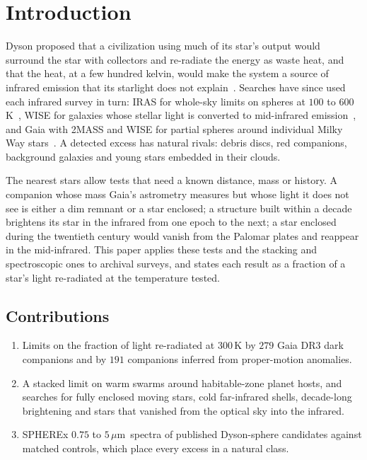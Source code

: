 \documentclass[3p,11pt]{elsarticle}
\newcommand{\um}{\,$\mu$m}
\begin{document}
\section{Introduction}\label{sec:intro}

Dyson proposed that a civilization using much of its star's output would surround the
star with collectors and re-radiate the energy as waste heat, and that the heat, at a
few hundred kelvin, would make the system a source of infrared emission that its
starlight does not explain~\cite{Dyson1960}. Searches have since used each infrared
survey in turn: IRAS for whole-sky limits on spheres at $100$ to $600$\,K~\cite{Carrigan2009},
WISE for galaxies whose stellar light is converted to mid-infrared
emission~\cite{Wright2014,Griffith2015}, and Gaia with 2MASS and WISE for partial spheres
around individual Milky Way stars~\cite{Suazo2022,Suazo2024,Contardo2024}. A detected
excess has natural rivals: debris discs, red companions, background galaxies and
young stars embedded in their clouds.

The nearest stars allow tests that need a known distance, mass or history. A companion
whose mass Gaia's astrometry measures but whose light it does not see is either a dim
remnant or a star enclosed; a structure built within a decade brightens its star in the
infrared from one epoch to the next; a star enclosed during the twentieth century would
vanish from the Palomar plates and reappear in the mid-infrared. This paper applies
these tests and the stacking and spectroscopic ones to archival surveys, and states each
result as a fraction of a star's light re-radiated at the temperature tested.

\subsection{Contributions}
\begin{enumerate}[leftmargin=*,itemsep=1pt]
\item Limits on the fraction of light re-radiated at $300$\,K by $279$ Gaia DR3 dark
companions and by $191$ companions inferred from proper-motion anomalies.
\item A stacked limit on warm swarms around habitable-zone planet hosts, and searches
for fully enclosed moving stars, cold far-infrared shells, decade-long brightening and
stars that vanished from the optical sky into the infrared.
\item SPHEREx $0.75$ to $5$\um\ spectra of published Dyson-sphere candidates against
matched controls, which place every excess in a natural class.
\end{enumerate}
\end{document}
